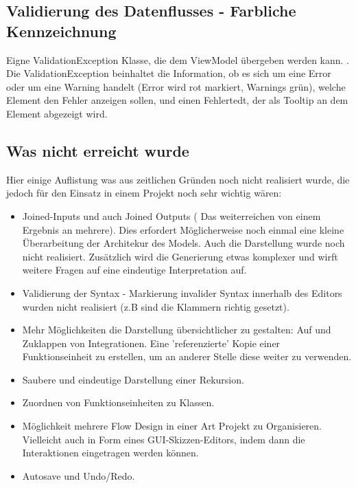 \subsection{Validierung des Datenflusses - Farbliche Kennzeichnung }

Eigne ValidationException Klasse, die dem ViewModel übergeben werden kann. .
Die ValidationException beinhaltet die Information, ob es sich um eine Error oder um eine Warning handelt (Error wird rot markiert, Warnings grün), welche  Element den Fehler anzeigen sollen, und einen Fehlertedt, der als Tooltip an dem Element abgezeigt wird.


\subsection{Was nicht erreicht wurde}

Hier einige Auflistung was aus zeitlichen Gründen noch nicht realisiert
wurde, die jedoch für den Einsatz in einem Projekt noch sehr wichtig wären:
\begin{itemize}
	\item Joined-Inputs und auch Joined Outputs ( Das weiterreichen von einem Ergebnis an mehrere). Dies erfordert Möglicherweise noch einmal
	eine kleine Überarbeitung der Architekur des Models. Auch die Darstellung wurde noch nicht realisiert. Zusätzlich wird die Generierung etwas komplexer und wirft weitere Fragen auf eine eindeutige Interpretation auf.
	
	\item Validierung der Syntax - Markierung invalider Syntax innerhalb des Editors wurden nicht realisiert (z.B sind die Klammern richtig gesetzt).
	
	\item Mehr Möglichkeiten die Darstellung übersichtlicher zu gestalten: Auf und
	Zuklappen von Integrationen. Eine 'referenzierte' Kopie einer
	Funktionseinheit zu erstellen, um an anderer Stelle diese weiter zu
	verwenden.
	\item Saubere und eindeutige Darstellung einer Rekursion.
	\item Zuordnen von Funktionseinheiten zu Klassen.
	\item Möglichkeit mehrere Flow Design in einer Art Projekt zu Organisieren.
	Vielleicht auch in Form eines GUI-Skizzen-Editors, indem dann die
	Interaktionen eingetragen werden können.
	\item Autosave und Undo/Redo.
\end{itemize}



